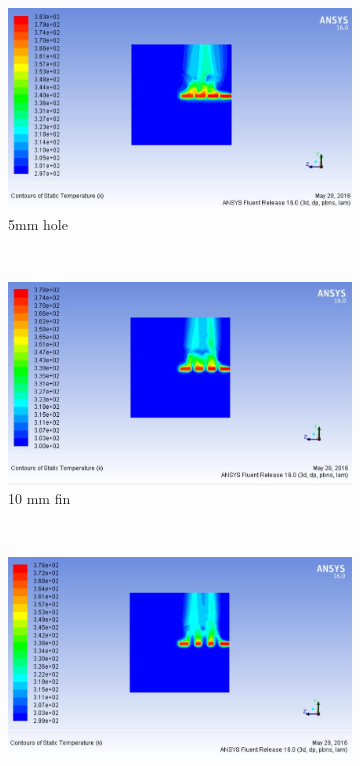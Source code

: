 \begin{figure}[h]
 	\begin{subfigure}[b]{0.5\textwidth}
 		\includegraphics[width=\textwidth]{121.jpg}
 		\caption{5mm hole}
 		\label{fig:structured}
 	\end{subfigure}%
 	~ %
 	\begin{subfigure}[b]{0.5\textwidth}
 		\includegraphics[width=\textwidth]{1211.jpg}
 		\caption{10 mm fin}
 		\label{fig:unstructured}
 	\end{subfigure}
 	~ %
 	\begin{subfigure}[b]{0.5\textwidth}
 		\includegraphics[width=\textwidth]{122.jpg}

\end{subfigure}
\end{figure}
